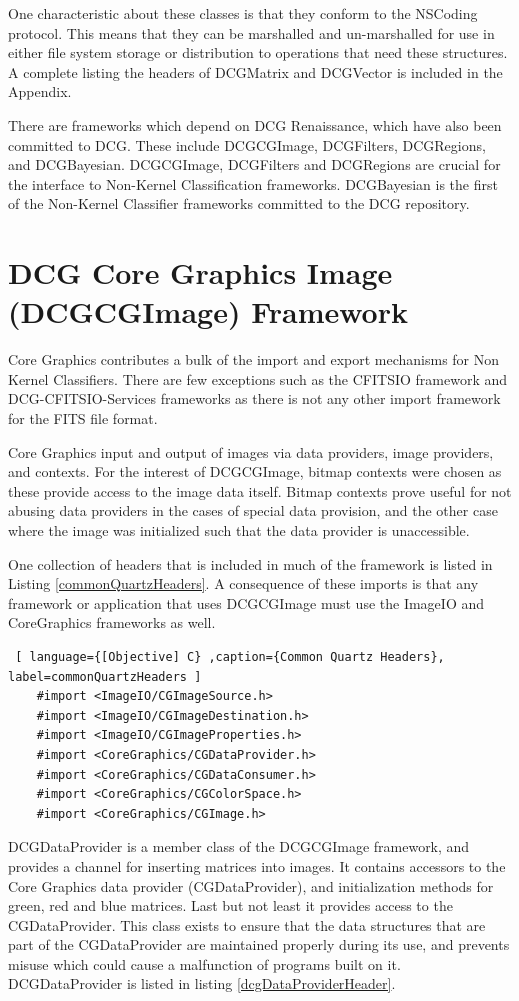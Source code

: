\documentclass[12pt]{report}
\begin{document}
One characteristic about these classes is that they conform to the NSCoding protocol.  This means that they can be marshalled and un-marshalled for use in either file system storage or distribution to operations that need these structures.  A complete listing the headers of DCGMatrix and DCGVector is included in the Appendix.  

There are frameworks which depend on DCG Renaissance, which have also been committed to DCG.  These include DCGCGImage, DCGFilters, DCGRegions, and DCGBayesian.   DCGCGImage, DCGFilters and DCGRegions are crucial for the interface to Non-Kernel Classification frameworks.  DCGBayesian is the first of the Non-Kernel Classifier frameworks committed to the DCG repository.  

\section{DCG Core Graphics Image (DCGCGImage) Framework}
Core Graphics contributes a bulk of the import and export mechanisms for Non Kernel Classifiers.  There are few exceptions such as the CFITSIO framework and DCG-CFITSIO-Services frameworks as there is not any other import framework for the FITS file format.  

Core Graphics input and output of images via data providers, image providers, and contexts.  For the interest of DCGCGImage, bitmap contexts were chosen as these provide access to the image data itself.  Bitmap contexts prove useful for not abusing data providers in the cases of special data provision, and the other case where the image was initialized such that the data provider is unaccessible.   

One collection of headers that is included in much of the framework is listed in Listing \ref{commonQuartzHeaders}.  A consequence of these imports is that any framework or application that uses DCGCGImage must use the ImageIO and CoreGraphics frameworks as well.  

\begin{lstlisting} [ language={[Objective] C} ,caption={Common Quartz Headers}, label=commonQuartzHeaders ] 
	#import <ImageIO/CGImageSource.h>
	#import <ImageIO/CGImageDestination.h>
	#import <ImageIO/CGImageProperties.h>
	#import <CoreGraphics/CGDataProvider.h>
	#import <CoreGraphics/CGDataConsumer.h>
	#import <CoreGraphics/CGColorSpace.h>
	#import <CoreGraphics/CGImage.h>
\end{lstlisting}

DCGDataProvider is a member class of the DCGCGImage framework, and provides a channel for inserting  matrices into images.   It contains accessors to the Core Graphics data provider (CGDataProvider), and initialization methods for green, red and blue matrices.  Last but not least it provides access to the CGDataProvider.   This class exists to ensure that the data structures that are part of the CGDataProvider are maintained properly during its use, and prevents misuse which could cause a malfunction of programs built on it.  DCGDataProvider is listed in listing \ref{dcgDataProviderHeader}.
\end{document}
